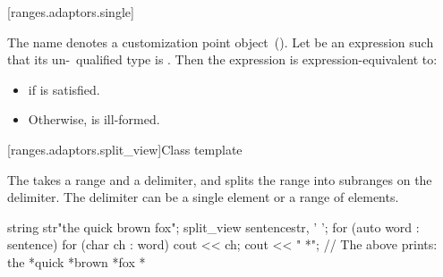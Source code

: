 [ranges.adaptors.single]{}

\pnum
The name  denotes a customization point object~().
Let  be an expression such that its un-\cv\ qualified type
is . Then the expression  is expression-equivalent
to:

\begin{itemize}
\item {} if  is satisfied.
\item Otherwise,  is ill-formed.
\end{itemize}

[ranges.adaptors.split_view]{Class template }

\pnum
The  takes a range and a delimiter, and splits the range into
subranges on the delimiter. The delimiter can be a single element or a range of
elements.

\pnum
\enterexample
\begin{codeblock}
string str{"the quick brown fox"};
split_view sentence{str, ' '};
for (auto word : sentence) {
  for (char ch : word)
    cout << ch;
  cout << " *";
}
// The above prints: the *quick *brown *fox *
\end{codeblock}
\exitexample

